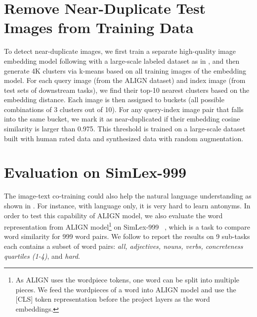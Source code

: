\documentclass{article}
\begin{document}




\clearpage
\newpage

\appendix

\section{Remove Near-Duplicate Test Images from Training Data} \label{sec:near-dup}
To detect near-duplicate images, we first train a separate high-quality image embedding model following \cite{wang:sbv3} with a large-scale labeled dataset as in \cite{juan:graphrise}, and then generate 4K clusters via k-means based on all training images of the embedding model. For each query image (from the ALIGN dataset) and index image (from test sets of downstream tasks), we find their top-10 nearest clusters based on the embedding distance. Each image is then assigned to  buckets (all possible combinations of 3 clusters out of 10). For any query-index image pair that falls into the same bucket, we mark it as near-duplicated if their embedding cosine similarity is larger than 0.975. This threshold is trained on a large-scale dataset built with human rated data and synthesized data with random augmentation.

\section{Evaluation on SimLex-999}

The image-text co-training could also help the natural language understanding as shown in \citet{kiros:picturebook}. 
For instance, with language only, it is very hard to learn antonyms.
In order to test this capability of ALIGN model, we also evaluate the word representation from ALIGN model\footnote{As ALIGN uses the wordpiece tokens, one word can be split into multiple pieces. We feed the wordpieces of a word into ALIGN model and use the [CLS] token representation before the project layers as the word embeddings.} on SimLex-999 ~\cite{simlex-999}, which is a task to compare word similarity for 999 word pairs.
We follow \citet{kiros:picturebook} to report the results on 9 sub-tasks each contains a subset of word pairs: \textit{all, adjectives, nouns, verbs, concreteness quartiles (1-4)}, and \textit{hard}.
\end{document}
